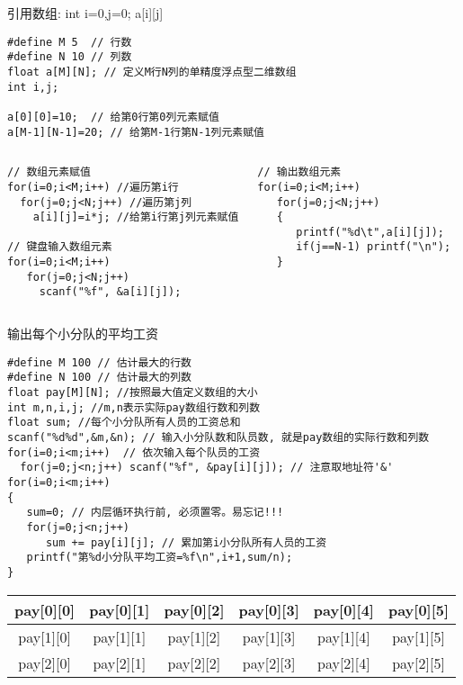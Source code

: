 \begin{frame}{引用数组: int i=0,j=0; a[i][j]}
\vspace{-0.3cm}
\begin{lstlisting}
#define M 5  // 行数
#define N 10 // 列数
float a[M][N]; // 定义M行N列的单精度浮点型二维数组
int i,j;

a[0][0]=10;  // 给第0行第0列元素赋值
a[M-1][N-1]=20; // 给第M-1行第N-1列元素赋值
\end{lstlisting}
\vspace{-0.2cm}
\begin{columns}[T]
\begin{lstlisting}
// 数组元素赋值
for(i=0;i<M;i++) //遍历第i行
  for(j=0;j<N;j++) //遍历第j列 
    a[i][j]=i*j; //给第i行第j列元素赋值
    
// 键盘输入数组元素
for(i=0;i<M;i++)
   for(j=0;j<N;j++)
     scanf("%f", &a[i][j]);
\end{lstlisting}
\begin{lstlisting}[frame=leftline]
// 输出数组元素
for(i=0;i<M;i++)
   for(j=0;j<N;j++)
   {
      printf("%d\t",a[i][j]);
      if(j==N-1) printf("\n");
   }
\end{lstlisting}
\end{columns}
\vspace{0.2cm}
\end{frame}

\begin{frame}{输出每个小分队的平均工资}
\vspace{-0.4cm}
\begin{lstlisting}
#define M 100 // 估计最大的行数
#define N 100 // 估计最大的列数
float pay[M][N]; //按照最大值定义数组的大小
int m,n,i,j; //m,n表示实际pay数组行数和列数
float sum; //每个小分队所有人员的工资总和
scanf("%d%d",&m,&n); // 输入小分队数和队员数, 就是pay数组的实际行数和列数
for(i=0;i<m;i++)  // 依次输入每个队员的工资
  for(j=0;j<n;j++) scanf("%f", &pay[i][j]); // 注意取地址符'&'
for(i=0;i<m;i++)
{
   sum=0; // 内层循环执行前, 必须置零。易忘记!!!
   for(j=0;j<n;j++)
      sum += pay[i][j]; // 累加第i小分队所有人员的工资
   printf("第%d小分队平均工资=%f\n",i+1,sum/n);
}
\end{lstlisting}
\tiny
\begin{tabular}{|c|c|c|c|c|c|}
	\hline  
	pay[0][0] & pay[0][1] & pay[0][2] & pay[0][3] & pay[0][4] & pay[0][5] \\ 
	\hline 
	pay[1][0] & pay[1][1] & pay[1][2] & pay[1][3] & pay[1][4] & pay[1][5] \\ 
	\hline 
	pay[2][0] & pay[2][1] & pay[2][2] & pay[2][3] & pay[2][4] & pay[2][5] \\ 
	\hline 
\end{tabular}
\vspace{0.01cm}
\end{frame}

